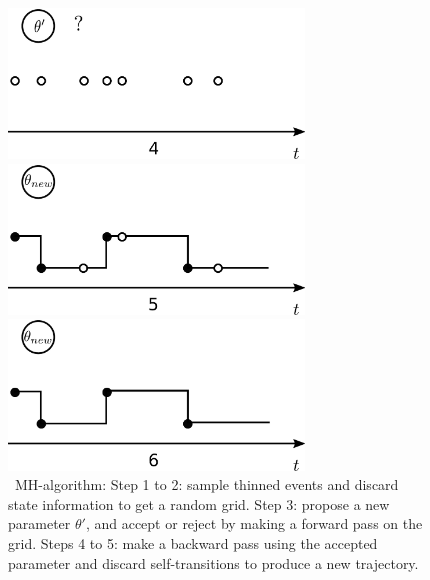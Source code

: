 \begin{figure}[H]
\begin{minipage}[!hp]{0.45\linewidth}
  \centering
    \includegraphics [width=0.70\textwidth, angle=0]{figs/plotn3.pdf}
    \vspace{-0 in}
  \end{minipage}
  \begin{minipage}[!hp]{0.45\linewidth}
  \centering
    \includegraphics [width=0.70\textwidth, angle=0]{figs/plotn4.pdf}
    \vspace{-0 in}
  \end{minipage}
  \begin{minipage}[!hp]{0.45\linewidth}
  \centering
    \includegraphics [width=0.70\textwidth, angle=0]{figs/plotn5.pdf}
    \vspace{-0 in}
  \end{minipage}
  \caption{\Naive\ MH-algorithm: Step 1 to 2: sample thinned events
  and discard state information to get a random grid. Step 3: 
propose a new parameter $\theta'$, and accept or reject by making
a forward pass on the grid. Steps 4 to 5: make a backward pass using
the accepted parameter and discard self-transitions to produce a new
trajectory.}
   \label{fig:naive_mh}
  \end{figure}

